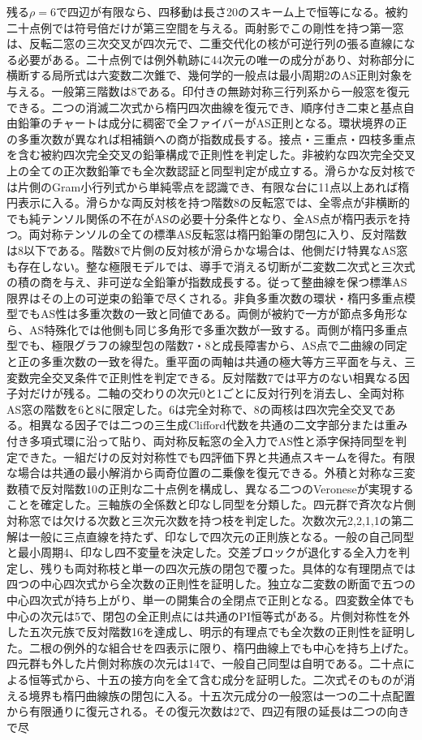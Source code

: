 \documentclass[11pt,a4paper]{ltjsarticle}
\begin{document}
残る$\rho=6$で四辺が有限なら、四移動は長さ20のスキーム上で恒等になる。被約二十点例では符号倍だけが第三空間を与える。両射影でこの剛性を持つ第一窓は、反転二窓の三次交叉が四次元で、二重交代化の核が可逆行列の張る直線になる必要がある。二十点例では例外軌跡に44次元の唯一の成分があり、対称部分に横断する局所式は六変数二次錐で、幾何学的一般点は最小周期2のAS正則対象を与える。一般第三階数は8である。印付きの無跡対称三行列系から一般窓を復元できる。二つの消滅二次式から楕円四次曲線を復元でき、順序付き二束と基点自由鉛筆のチャートは成分に稠密で全ファイバーがAS正則となる。環状境界の正の多重次数が異なれば相補鎖への商が指数成長する。接点・三重点・四枝多重点を含む被約四次完全交叉の鉛筆構成で正則性を判定した。非被約な四次完全交叉上の全ての正次数鉛筆でも全次数認証と同型判定が成立する。滑らかな反対核では片側のGram小行列式から単純零点を認識でき、有限な台に11点以上あれば楕円表示に入る。滑らかな両反対核を持つ階数8の反転窓では、全零点が非横断的でも純テンソル関係の不在がASの必要十分条件となり、全AS点が楕円表示を持つ。両対称テンソルの全ての標準AS反転窓は楕円鉛筆の閉包に入り、反対階数は8以下である。階数8で片側の反対核が滑らかな場合は、他側だけ特異なAS窓も存在しない。整な極限モデルでは、導手で消える切断が二変数二次式と三次式の積の商を与え、非可逆な全鉛筆が指数成長する。従って整曲線を保つ標準AS限界はその上の可逆束の鉛筆で尽くされる。非負多重次数の環状・楕円多重点模型でもAS性は多重次数の一致と同値である。両側が被約で一方が節点多角形なら、AS特殊化では他側も同じ多角形で多重次数が一致する。両側が楕円多重点型でも、極限グラフの線型包の階数7・8と成長障害から、AS点で二曲線の同定と正の多重次数の一致を得た。重平面の両軸は共通の極大等方三平面を与え、三変数完全交叉条件で正則性を判定できる。反対階数7では平方のない相異なる因子対だけが残る。二軸の交わりの次元0と1ごとに反対行列を消去し、全両対称AS窓の階数を6と8に限定した。6は完全対称で、8の両核は四次完全交叉である。相異なる因子では二つの三生成Clifford代数を共通の二文字部分または重み付き多項式環に沿って貼り、両対称反転窓の全入力でAS性と添字保持同型を判定できた。一組だけの反対対称性でも四評価下界と共通点スキームを得た。有限な場合は共通の最小解消から両奇位置の二乗像を復元できる。外積と対称な三変数積で反対階数10の正則な二十点例を構成し、異なる二つのVeroneseが実現することを確定した。三軸族の全係数と印なし同型を分類した。四元群で斉次な片側対称窓では欠ける次数と三次元次数を持つ枝を判定した。次数次元2,2,1,1の第二解は一般に三点直線を持たず、印なしで四次元の正則族となる。一般の自己同型と最小周期4、印なし四不変量を決定した。交差ブロックが退化する全入力を判定し、残りも両対称枝と単一の四次元族の閉包で覆った。具体的な有理閉点では四つの中心四次式から全次数の正則性を証明した。独立な二変数の断面で五つの中心四次式が持ち上がり、単一の開集合の全閉点で正則となる。四変数全体でも中心の次元は5で、閉包の全正則点には共通のPI恒等式がある。片側対称性を外した五次元族で反対階数16を達成し、明示的有理点でも全次数の正則性を証明した。二根の例外的な組合せを四表示に限り、楕円曲線上でも中心を持ち上げた。四元群も外した片側対称族の次元は14で、一般自己同型は自明である。二十点による恒等式から、十五の接方向を全て含む成分を証明した。二次式そのものが消える境界も楕円曲線族の閉包に入る。十五次元成分の一般窓は一つの二十点配置から有限通りに復元される。その復元次数は2で、四辺有限の延長は二つの向きで尽
\end{document}
